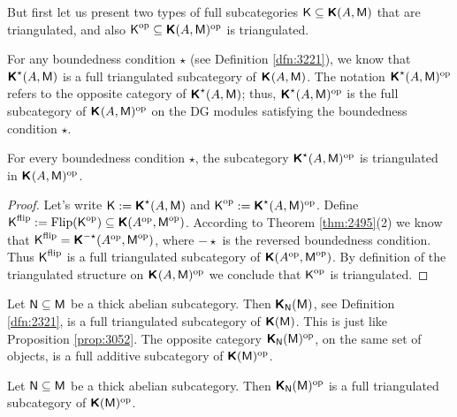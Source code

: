 But first let us present two types of full subcategories
$\operatorname{\mathsf{K}} \subseteq \boldsymbol{\mathsf{K}}(A, \operatorname{\mathsf{M}})$ that are triangulated, and also 
$\operatorname{\mathsf{K}}^{\mathrm{op}} \subseteq \boldsymbol{\mathsf{K}}(A, \operatorname{\mathsf{M}})^{\mathrm{op}}$ 
is triangulated. 

For any boundedness condition $\star$ (see Definition \ref{dfn:3221}), we know 
that $\boldsymbol{\mathsf{K}}^{\star}(A, \operatorname{\mathsf{M}})$
is a full triangulated subcategory of $\boldsymbol{\mathsf{K}}^{}(A, \operatorname{\mathsf{M}})$. 
The notation 
$\boldsymbol{\mathsf{K}}^{\star}(A, \operatorname{\mathsf{M}})^{\mathrm{op}}$
refers to the opposite category of 
$\boldsymbol{\mathsf{K}}^{\star}(A, \operatorname{\mathsf{M}})$;
thus, $\boldsymbol{\mathsf{K}}^{\star}(A, \operatorname{\mathsf{M}})^{\mathrm{op}}$ is the full subcategory of 
$\boldsymbol{\mathsf{K}}^{}(A, \operatorname{\mathsf{M}})^{\mathrm{op}}$
on the DG modules satisfying the boundedness condition $\star$. 

\begin{prop} \label{prop:3050}
For every boundedness condition $\star$, the subcategory 
$\boldsymbol{\mathsf{K}}^{\star}(A, \operatorname{\mathsf{M}})^{\mathrm{op}}$
is triangulated in $\boldsymbol{\mathsf{K}}^{}(A, \operatorname{\mathsf{M}})^{\mathrm{op}}$. 
\end{prop}

\begin{proof}
Let's write $\operatorname{\mathsf{K}} := \boldsymbol{\mathsf{K}}^{\star}(A, \operatorname{\mathsf{M}})$ and
$\operatorname{\mathsf{K}}^{\mathrm{op}} := \boldsymbol{\mathsf{K}}^{\star}(A, \operatorname{\mathsf{M}})^{\mathrm{op}}$.
Define  
$\cat{K}^{\mrm{flip}} \lb := \opn{Flip}(\cat{K}^{\mrm{op}}) \sub 
\dcat{K}(A^{\mrm{op}}, \cat{M}^{\mrm{op}})$.
According to Theorem \ref{thm:2495}(2) we know that
$\operatorname{\mathsf{K}}^{\mathrm{flip}} = \boldsymbol{\mathsf{K}}^{-\star}(A^{\mathrm{op}}, \operatorname{\mathsf{M}}^{\mathrm{op}})$,
where $-\star$ is the reversed boundedness condition. 
Thus $\operatorname{\mathsf{K}}^{\mathrm{flip}}$ is a full triangulated subcategory of
$\boldsymbol{\mathsf{K}}(A^{\mathrm{op}}, \operatorname{\mathsf{M}}^{\mathrm{op}})$. 
By definition of the triangulated structure on 
$\boldsymbol{\mathsf{K}}^{}(A, \operatorname{\mathsf{M}})^{\mathrm{op}}$
we conclude that $\operatorname{\mathsf{K}}^{\mathrm{op}}$ is triangulated.
\end{proof}

Let $\operatorname{\mathsf{N}} \subseteq \operatorname{\mathsf{M}}$ be a thick abelian subcategory. Then 
$\boldsymbol{\mathsf{K}}_{\operatorname{\mathsf{N}}}(\operatorname{\mathsf{M}})$, see Definition \ref{dfn:2321},  
is a full triangulated subcategory of $\boldsymbol{\mathsf{K}}(\operatorname{\mathsf{M}})$.
This is just like Proposition \ref{prop:3052}.
The opposite category 
$\boldsymbol{\mathsf{K}}_{\operatorname{\mathsf{N}}}(\operatorname{\mathsf{M}})^{\mathrm{op}}$,
on the same set of objects, is a full additive subcategory of 
$\boldsymbol{\mathsf{K}}(\operatorname{\mathsf{M}})^{\mathrm{op}}$. 

\begin{prop} \label{prop:3051}
Let $\operatorname{\mathsf{N}} \subseteq \operatorname{\mathsf{M}}$ be a thick abelian subcategory.
Then 
$\boldsymbol{\mathsf{K}}_{\operatorname{\mathsf{N}}}(\operatorname{\mathsf{M}})^{\mathrm{op}}$
is a full triangulated subcategory of $\boldsymbol{\mathsf{K}}(\operatorname{\mathsf{M}})^{\mathrm{op}}$. 
\end{prop}

